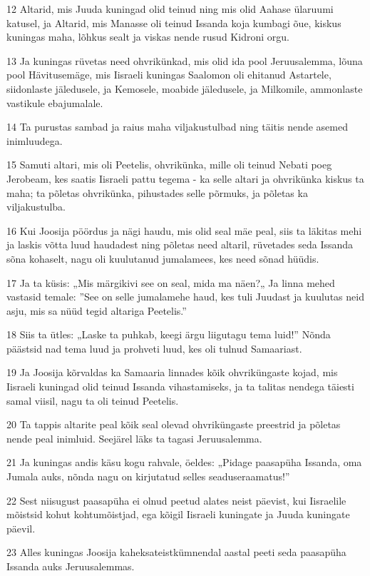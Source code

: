 \par 12 Altarid, mis Juuda kuningad olid teinud ning mis olid Aahase ülaruumi katusel, ja Altarid, mis Manasse oli teinud Issanda koja kumbagi õue, kiskus kuningas maha, lõhkus sealt ja viskas nende rusud Kidroni orgu.
\par 13 Ja kuningas rüvetas need ohvrikünkad, mis olid ida pool Jeruusalemma, lõuna pool Hävitusemäge, mis Iisraeli kuningas Saalomon oli ehitanud Astartele, siidonlaste jäledusele, ja Kemosele, moabide jäledusele, ja Milkomile, ammonlaste vastikule ebajumalale.
\par 14 Ta purustas sambad ja raius maha viljakustulbad ning täitis nende asemed inimluudega.
\par 15 Samuti altari, mis oli Peetelis, ohvrikünka, mille oli teinud Nebati poeg Jerobeam, kes saatis Iisraeli pattu tegema - ka selle altari ja ohvrikünka kiskus ta maha; ta põletas ohvrikünka, pihustades selle põrmuks, ja põletas ka viljakustulba.
\par 16 Kui Joosija pöördus ja nägi haudu, mis olid seal mäe peal, siis ta läkitas mehi ja laskis võtta luud haudadest ning põletas need altaril, rüvetades seda Issanda sõna kohaselt, nagu oli kuulutanud jumalamees, kes need sõnad hüüdis.
\par 17 Ja ta küsis: „Mis märgikivi see on seal, mida ma näen?„ Ja linna mehed vastasid temale: ”See on selle jumalamehe haud, kes tuli Juudast ja kuulutas neid asju, mis sa nüüd tegid altariga Peetelis.”
\par 18 Siis ta ütles: „Laske ta puhkab, keegi ärgu liigutagu tema luid!” Nõnda päästsid nad tema luud ja prohveti luud, kes oli tulnud Samaariast.
\par 19 Ja Joosija kõrvaldas ka Samaaria linnades kõik ohvriküngaste kojad, mis Iisraeli kuningad olid teinud Issanda vihastamiseks, ja ta talitas nendega täiesti samal viisil, nagu ta oli teinud Peetelis.
\par 20 Ta tappis altarite peal kõik seal olevad ohvriküngaste preestrid ja põletas nende peal inimluid. Seejärel läks ta tagasi Jeruusalemma.
\par 21 Ja kuningas andis käsu kogu rahvale, öeldes: „Pidage paasapüha Issanda, oma Jumala auks, nõnda nagu on kirjutatud selles seaduseraamatus!”
\par 22 Sest niisugust paasapüha ei olnud peetud alates neist päevist, kui Iisraelile mõistsid kohut kohtumõistjad, ega kõigil Iisraeli kuningate ja Juuda kuningate päevil.
\par 23 Alles kuningas Joosija kaheksateistkümnendal aastal peeti seda paasapüha Issanda auks Jeruusalemmas.
